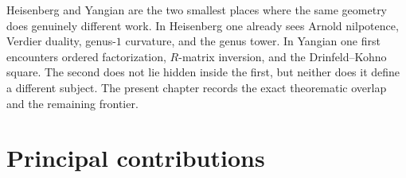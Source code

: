 \begin{remark}
Heisenberg and Yangian are the two smallest places where the same
geometry does genuinely different work.  In Heisenberg one already sees
Arnold nilpotence, Verdier duality, genus-$1$ curvature, and the genus
tower.  In Yangian one first encounters ordered factorization,
$R$-matrix inversion, and the Drinfeld--Kohno square.  The second does
not lie hidden inside the first, but neither does it define a different
subject.  The present chapter records the exact theorematic overlap and
the remaining frontier.
\end{remark}

\section{Principal contributions}\label{sec:principal-contributions}

